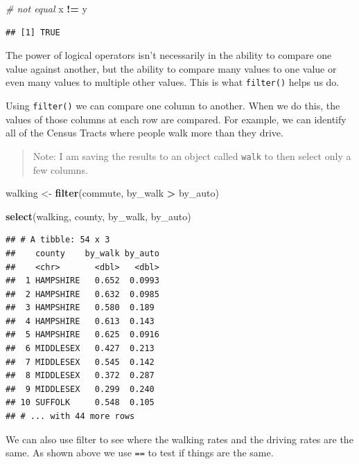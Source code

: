\documentclass[
]{book}
\newenvironment{Shaded}{\begin{snugshade}}{\end{snugshade}}
\newcommand{\CommentTok}[1]{\textcolor[rgb]{0.56,0.35,0.01}{\textit{#1}}}
\newcommand{\KeywordTok}[1]{\textcolor[rgb]{0.13,0.29,0.53}{\textbf{#1}}}
\newcommand{\NormalTok}[1]{#1}
\newcommand{\OperatorTok}[1]{\textcolor[rgb]{0.81,0.36,0.00}{\textbf{#1}}}
\newcommand{\StringTok}[1]{\textcolor[rgb]{0.31,0.60,0.02}{#1}}
\begin{document}
\begin{Shaded}
\begin{Highlighting}[]
\CommentTok{\# not equal}
\NormalTok{x }\OperatorTok{!=}\StringTok{ }\NormalTok{y}
\end{Highlighting}
\end{Shaded}

\begin{verbatim}
## [1] TRUE
\end{verbatim}

The power of logical operators isn't necessarily in the ability to compare one value against another, but the ability to compare many values to one value or even many values to multiple other values. This is what \texttt{filter()} helps us do.

Using \texttt{filter()} we can compare one column to another. When we do this, the values of those columns at each row are compared. For example, we can identify all of the Census Tracts where people walk more than they drive.

\begin{quote}
Note: I am saving the results to an object called \texttt{walk} to then select only a few columns.
\end{quote}

\begin{Shaded}
\begin{Highlighting}[]
\NormalTok{walking \textless{}{-}}\StringTok{ }\KeywordTok{filter}\NormalTok{(commute, by\_walk }\OperatorTok{\textgreater{}}\StringTok{ }\NormalTok{by\_auto)}

\KeywordTok{select}\NormalTok{(walking, county, by\_walk, by\_auto)}
\end{Highlighting}
\end{Shaded}

\begin{verbatim}
## # A tibble: 54 x 3
##    county    by_walk by_auto
##    <chr>       <dbl>   <dbl>
##  1 HAMPSHIRE   0.652  0.0993
##  2 HAMPSHIRE   0.632  0.0985
##  3 HAMPSHIRE   0.580  0.189 
##  4 HAMPSHIRE   0.613  0.143 
##  5 HAMPSHIRE   0.625  0.0916
##  6 MIDDLESEX   0.427  0.213 
##  7 MIDDLESEX   0.545  0.142 
##  8 MIDDLESEX   0.372  0.287 
##  9 MIDDLESEX   0.299  0.240 
## 10 SUFFOLK     0.548  0.105 
## # ... with 44 more rows
\end{verbatim}

We can also use filter to see where the walking rates and the driving rates are the same. As shown above we use \texttt{==} to test if things are the same.
\end{document}

